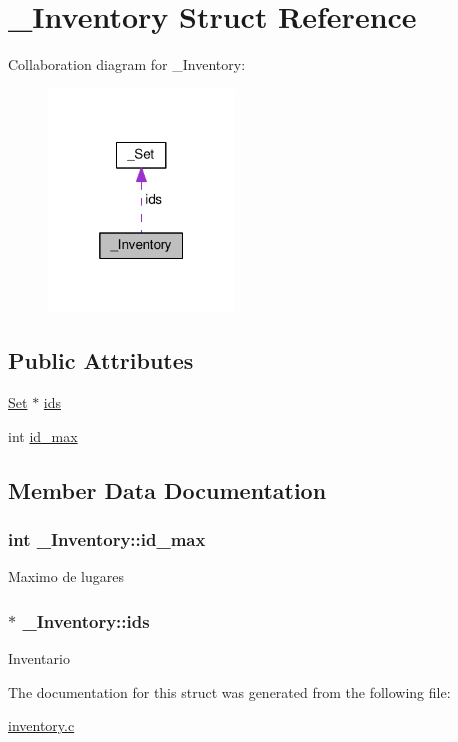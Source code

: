 \hypertarget{struct__Inventory}{\section{\+\_\+\+Inventory Struct Reference}
\label{struct__Inventory}
}


Collaboration diagram for \+\_\+\+Inventory\+:\nopagebreak
\begin{figure}[H]
\begin{center}
\leavevmode
\includegraphics[width=140pt]{struct__Inventory__coll__graph}
\end{center}
\end{figure}
\subsection*{Public Attributes}
\begin{DoxyCompactItemize}
\item 
\hyperlink{set_8h_a6d3b7f7c92cbb4577ef3ef7ddbf93161}{Set} $\ast$ \hyperlink{struct__Inventory_a7f6b5d7d1111e7e8f8999c656ae27d0c}{ids}
\item 
int \hyperlink{struct__Inventory_a4b104bc26c8e030cae3032cbe7d940a3}{id\+\_\+max}
\end{DoxyCompactItemize}


\subsection{Member Data Documentation}
\hypertarget{struct__Inventory_a4b104bc26c8e030cae3032cbe7d940a3}{
\subsubsection[{id\+\_\+max}]{\setlength{\rightskip}{0pt plus 5cm}int \+\_\+\+Inventory\+::id\+\_\+max}}\label{struct__Inventory_a4b104bc26c8e030cae3032cbe7d940a3}
Maximo de lugares \hypertarget{struct__Inventory_a7f6b5d7d1111e7e8f8999c656ae27d0c}{
\subsubsection[{ids}]{$\ast$ \+\_\+\+Inventory\+::ids}}\label{struct__Inventory_a7f6b5d7d1111e7e8f8999c656ae27d0c}
Inventario 

The documentation for this struct was generated from the following file\+:\begin{DoxyCompactItemize}
\item 
\hyperlink{inventory_8c}{inventory.\+c}\end{DoxyCompactItemize}
